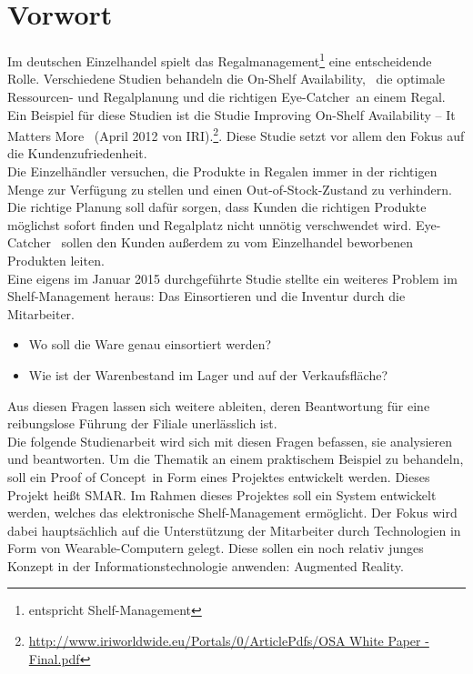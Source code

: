 \chapter{Vorwort}
\label{cha:vorwort}
Im deutschen Einzelhandel spielt das Regalmanagement\footnote{entspricht Shelf-Management} eine entscheidende Rolle. Verschiedene Studien behandeln die \glqq On-Shelf Availability\grqq ,~ die optimale Ressourcen- und Regalplanung und die richtigen \glqq Eye-Catcher\grqq\ an einem Regal. Ein Beispiel für diese Studien ist \zB die Studie \glqq Improving On-Shelf Availability -- It Matters More\grqq~ (April 2012 von IRI).\footnote{\url{http://www.iriworldwide.eu/Portals/0/ArticlePdfs/OSA White Paper - Final.pdf}}. Diese Studie setzt vor allem den Fokus auf die Kundenzufriedenheit.\\

Die Einzelhändler versuchen, die Produkte in Regalen immer in der richtigen Menge zur Verfügung zu stellen und einen \glqq Out-of-Stock\grqq -Zustand zu verhindern. Die richtige Planung soll dafür sorgen, dass Kunden die richtigen Produkte möglichst sofort finden und Regalplatz nicht unnötig verschwendet wird. \glqq Eye-Catcher\grqq~ sollen den Kunden außerdem zu vom Einzelhandel beworbenen Produkten leiten.\\

Eine eigens im Januar 2015 durchgeführte Studie stellte ein weiteres Problem im Shelf-Management heraus: Das Einsortieren und die Inventur durch die Mitarbeiter.
\begin{itemize}
	\item Wo soll die Ware genau einsortiert werden?
	\item Wie ist der Warenbestand im Lager und auf der Verkaufsfläche?
\end{itemize}
Aus diesen Fragen lassen sich weitere ableiten, deren Beantwortung für eine reibungslose Führung der Filiale unerlässlich ist.\\

Die folgende Studienarbeit wird sich mit diesen Fragen befassen, sie analysieren und beantworten. Um die Thematik an einem praktischem Beispiel zu behandeln, soll ein \glqq Proof of Concept\grqq~in Form eines Projektes entwickelt werden. Dieses Projekt heißt \ac{SMAR}. Im Rahmen dieses Projektes soll ein System entwickelt werden, welches das elektronische Shelf-Management ermöglicht. Der Fokus wird dabei hauptsächlich auf die Unterstützung der Mitarbeiter durch Technologien in Form von Wearable-Computern gelegt. Diese sollen ein noch relativ junges Konzept in der Informationstechnologie anwenden: Augmented Reality.

